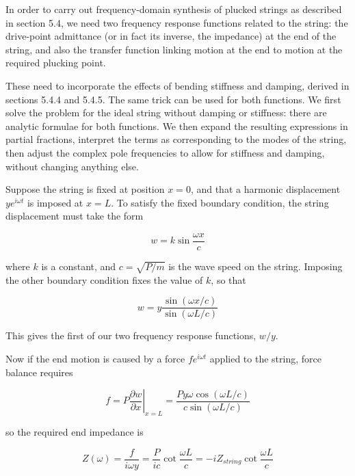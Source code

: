   In order to carry out frequency-domain synthesis of plucked strings as 
  described in section 5.4, we need two frequency response functions related to 
  the string: the drive-point admittance (or in fact its inverse, the 
  impedance) at the end of the string, and also the transfer function linking 
  motion at the end to motion at the required plucking point. 

  These need to incorporate the effects of bending stiffness and damping, 
  derived in sections 5.4.4 and 5.4.5. The same trick can be used for both 
  functions. We first solve the problem for the ideal string without damping or 
  stiffness: there are analytic formulae for both functions. We then expand the 
  resulting expressions in partial fractions, interpret the terms as 
  corresponding to the modes of the string, then adjust the complex pole 
  frequencies to allow for stiffness and damping, without changing anything 
  else. 

  Suppose the string is fixed at position $x=0$, and that a harmonic 
  displacement $y e^{i \omega t}$ is imposed at $x=L$. To satisfy the fixed 
  boundary condition, the string displacement must take the form 

  \begin{equation*}w=k \sin \frac{\omega x}{c} \tag{1}\end{equation*} 

  \noindent{}where $k$ is a constant, and $c=\sqrt{P/m}$ is the wave speed on 
  the string. Imposing the other boundary condition fixes the value of $k$, so 
  that 

  \begin{equation*}w=y \dfrac{ \sin (\omega x/c)}{ \sin (\omega L/c)} 
  \tag{2}\end{equation*} 

  This gives the first of our two frequency response functions, $w/y$. 

  Now if the end motion is caused by a force $f e^{i \omega t}$ applied to the 
  string, force balance requires 

  \begin{equation*}f=P \left. \dfrac{\partial w}{\partial x} 
  \right|_{x=L}=\dfrac{Py\omega \cos(\omega L/c)}{c \sin (\omega L/c)} 
  \tag{3}\end{equation*} 

  \noindent{}so the required end impedance is 

  \begin{equation*}Z(\omega)=\frac{f}{i \omega y}=\frac{P}{ic} \cot 
  \frac{\omega L}{c}=-i Z_{string} \cot \frac{\omega L}{c} 
  \tag{4}\end{equation*} 

